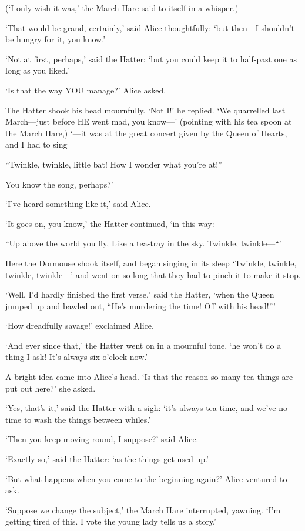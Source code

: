 \documentclass[12pt]{book}
\begin{document}
\begin{Parallel}[p]{}{}
{(‘I only wish it was,’ the March Hare said to itself in a whisper.)

‘That would be grand, certainly,’ said Alice thoughtfully: ‘but then—I shouldn’t be hungry for it, you know.’

‘Not at first, perhaps,’ said the Hatter: ‘but you could keep it to half-past one as long as you liked.’

‘Is that the way YOU manage?’ Alice asked.

The Hatter shook his head mournfully. ‘Not I!’ he replied. ‘We quarrelled last March—just before HE went mad, you know—’ (pointing with his tea spoon at the March Hare,) ‘—it was at the great concert given by the Queen of Hearts, and I had to sing

     “Twinkle, twinkle, little bat!
     How I wonder what you’re at!”

You know the song, perhaps?’

‘I’ve heard something like it,’ said Alice.

‘It goes on, you know,’ the Hatter continued, ‘in this way:—

     “Up above the world you fly,
     Like a tea-tray in the sky.
         Twinkle, twinkle—“’

Here the Dormouse shook itself, and began singing in its sleep ‘Twinkle, twinkle, twinkle, twinkle—’ and went on so long that they had to pinch it to make it stop.

‘Well, I’d hardly finished the first verse,’ said the Hatter, ‘when the Queen jumped up and bawled out, “He’s murdering the time! Off with his head!”’

‘How dreadfully savage!’ exclaimed Alice.

‘And ever since that,’ the Hatter went on in a mournful tone, ‘he won’t do a thing I ask! It’s always six o’clock now.’

A bright idea came into Alice’s head. ‘Is that the reason so many tea-things are put out here?’ she asked.

‘Yes, that’s it,’ said the Hatter with a sigh: ‘it’s always tea-time, and we’ve no time to wash the things between whiles.’

‘Then you keep moving round, I suppose?’ said Alice.

‘Exactly so,’ said the Hatter: ‘as the things get used up.’

‘But what happens when you come to the beginning again?’ Alice ventured to ask.

‘Suppose we change the subject,’ the March Hare interrupted, yawning. ‘I’m getting tired of this. I vote the young lady tells us a story.’

}
\end{Parallel}
\end{document}
